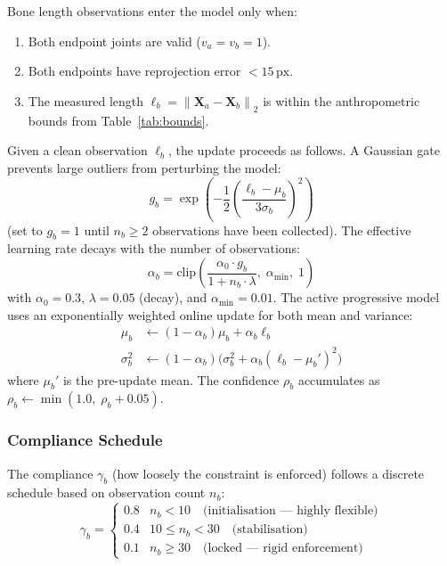 \documentclass[11pt,a4paper]{article}
\newcommand{\norm}[1]{\left\lVert#1\right\rVert}
\begin{document}
Bone length observations enter the model only when:
\begin{enumerate}
  \item Both endpoint joints are valid ($v_a = v_b = 1$).
  \item Both endpoints have reprojection error $< 15\,\text{px}$.
  \item The measured length $\ell_b = \norm{\mathbf{X}_a - \mathbf{X}_b}_2$ is within
    the anthropometric bounds from Table~\ref{tab:bounds}.
\end{enumerate}

Given a clean observation $\ell_b$, the update proceeds as follows. A Gaussian gate
prevents large outliers from perturbing the model:
\begin{equation}
  g_b = \exp\!\left(-\frac{1}{2}\left(\frac{\ell_b - \mu_b}{3\sigma_b}\right)^2\right)
  \label{eq:gate}
\end{equation}
(set to $g_b = 1$ until $n_b \geq 2$ observations have been collected). The effective
learning rate decays with the number of observations:
\begin{equation}
  \alpha_b = \text{clip}\!\left(\frac{\alpha_0 \cdot g_b}{1 + n_b \cdot \lambda},\; \alpha_\text{min},\; 1\right)
  \label{eq:lr}
\end{equation}
with $\alpha_0 = 0.3$, $\lambda = 0.05$ (decay), and $\alpha_\text{min} = 0.01$.
The active progressive model uses an exponentially weighted online update for both
mean and variance:
\begin{align}
  \mu_b &\leftarrow (1 - \alpha_b)\mu_b + \alpha_b \ell_b \\
  \sigma_b^2 &\leftarrow (1 - \alpha_b)\bigl(\sigma_b^2 + \alpha_b(\ell_b - \mu_b')^2\bigr)
  \label{eq:ewvar}
\end{align}
where $\mu_b'$ is the pre-update mean. The confidence $\rho_b$ accumulates as
$\rho_b \leftarrow \min(1.0,\; \rho_b + 0.05)$.

\subsubsection{Compliance Schedule}

The compliance $\gamma_b$ (how loosely the constraint is enforced) follows a discrete
schedule based on observation count $n_b$:
\begin{equation}
  \gamma_b = \begin{cases}
    0.8 & n_b < 10 \quad \text{(initialisation — highly flexible)} \\
    0.4 & 10 \leq n_b < 30 \quad \text{(stabilisation)} \\
    0.1 & n_b \geq 30 \quad \text{(locked — rigid enforcement)}
  \end{cases}
  \label{eq:compliance}
\end{equation}
\end{document}
